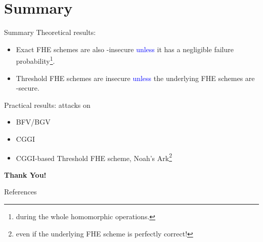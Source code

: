 \documentclass[handout]{beamer}
\begin{document}
 \section{Summary}
    \begin{frame}{Summary}
    \small
    Theoretical results: 
    \begin{itemize}
        \item Exact FHE schemes are also \indcpad-insecure \textcolor{blue}{unless} it has a negligible failure probability\footnote{during the whole homomorphic operations.}.\pause
        \item Threshold FHE schemes are insecure \textcolor{blue}{unless} the underlying FHE schemes are \indcpad-secure. 
    \end{itemize}\vspace{0.3cm}\pause
    
    Practical results: \krd attacks on
        \begin{itemize}
            \item BFV/BGV
            \item CGGI\pause
            \item CGGI-based Threshold FHE scheme, {Noah's Ark}\footnote{even if the underlying FHE scheme is perfectly correct!}
        \end{itemize}\vspace{0.5cm}
    \end{frame}
    
    \begin{frame}{}
    \begin{center}
        {\Huge\bf Thank You!}
    \end{center}
    \end{frame}
    
    \begin{frame}{References}
    
    
    
    
    \end{frame}
\end{document}
